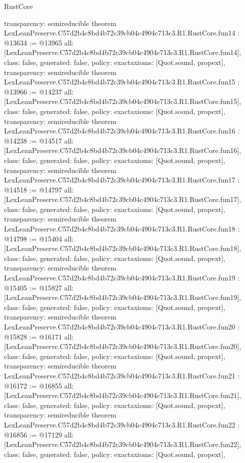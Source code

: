 \begin{lexlean}{RustCore}
\begin{coremodule}
{  transparency: semireducible
}
theorem LexLeanPreserve.C57d2b4c8bd4b72c39cb04c4904c713c3.R1.RustCore.fun14 : @13634 := @13965 {
  all: [LexLeanPreserve.C57d2b4c8bd4b72c39cb04c4904c713c3.R1.RustCore.fun14],
  class: false,
  generated: false,
  policy: exact{axioms: [Quot.sound, propext]},
  transparency: semireducible
}
theorem LexLeanPreserve.C57d2b4c8bd4b72c39cb04c4904c713c3.R1.RustCore.fun15 : @13966 := @14237 {
  all: [LexLeanPreserve.C57d2b4c8bd4b72c39cb04c4904c713c3.R1.RustCore.fun15],
  class: false,
  generated: false,
  policy: exact{axioms: [Quot.sound, propext]},
  transparency: semireducible
}
theorem LexLeanPreserve.C57d2b4c8bd4b72c39cb04c4904c713c3.R1.RustCore.fun16 : @14238 := @14517 {
  all: [LexLeanPreserve.C57d2b4c8bd4b72c39cb04c4904c713c3.R1.RustCore.fun16],
  class: false,
  generated: false,
  policy: exact{axioms: [Quot.sound, propext]},
  transparency: semireducible
}
theorem LexLeanPreserve.C57d2b4c8bd4b72c39cb04c4904c713c3.R1.RustCore.fun17 : @14518 := @14797 {
  all: [LexLeanPreserve.C57d2b4c8bd4b72c39cb04c4904c713c3.R1.RustCore.fun17],
  class: false,
  generated: false,
  policy: exact{axioms: [Quot.sound, propext]},
  transparency: semireducible
}
theorem LexLeanPreserve.C57d2b4c8bd4b72c39cb04c4904c713c3.R1.RustCore.fun18 : @14798 := @15404 {
  all: [LexLeanPreserve.C57d2b4c8bd4b72c39cb04c4904c713c3.R1.RustCore.fun18],
  class: false,
  generated: false,
  policy: exact{axioms: [Quot.sound, propext]},
  transparency: semireducible
}
theorem LexLeanPreserve.C57d2b4c8bd4b72c39cb04c4904c713c3.R1.RustCore.fun19 : @15405 := @15827 {
  all: [LexLeanPreserve.C57d2b4c8bd4b72c39cb04c4904c713c3.R1.RustCore.fun19],
  class: false,
  generated: false,
  policy: exact{axioms: [Quot.sound, propext]},
  transparency: semireducible
}
theorem LexLeanPreserve.C57d2b4c8bd4b72c39cb04c4904c713c3.R1.RustCore.fun20 : @15828 := @16171 {
  all: [LexLeanPreserve.C57d2b4c8bd4b72c39cb04c4904c713c3.R1.RustCore.fun20],
  class: false,
  generated: false,
  policy: exact{axioms: [Quot.sound, propext]},
  transparency: semireducible
}
theorem LexLeanPreserve.C57d2b4c8bd4b72c39cb04c4904c713c3.R1.RustCore.fun21 : @16172 := @16855 {
  all: [LexLeanPreserve.C57d2b4c8bd4b72c39cb04c4904c713c3.R1.RustCore.fun21],
  class: false,
  generated: false,
  policy: exact{axioms: [Quot.sound, propext]},
  transparency: semireducible
}
theorem LexLeanPreserve.C57d2b4c8bd4b72c39cb04c4904c713c3.R1.RustCore.fun22 : @16856 := @17129 {
  all: [LexLeanPreserve.C57d2b4c8bd4b72c39cb04c4904c713c3.R1.RustCore.fun22],
  class: false,
  generated: false,
  policy: exact{axioms: [Quot.sound, propext]},
}
\end{coremodule}
\end{lexlean}
